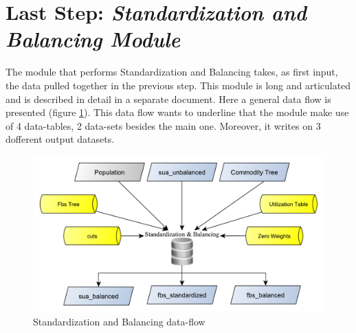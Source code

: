 \documentclass[]{article}
\begin{document}
\section{\texorpdfstring{Last Step: \emph{Standardization and Balancing
Module}}{Last Step: Standardization and Balancing Module}}\label{last-step-standardization-and-balancing-module}

The module that performs Standardization and Balancing takes, as first
input, the data pulled together in the previous step. This module is
long and articulated and is described in detail in a separate document.
Here a general data flow is presented (figure \ref{fig:f18}). This data
flow wants to underline that the module make use of 4 data-tables, 2
data-sets besides the main one. Moreover, it writes on 3 dofferent
output datasets.

\begin{figure}[H]

{\centering \includegraphics[width=0.8\linewidth]{images/SwsFbs/18_standBAl} 

}

\caption{\label{fig:f18}Standardization and Balancing data-flow}\label{fig:f18}
\end{figure}
\end{document}
